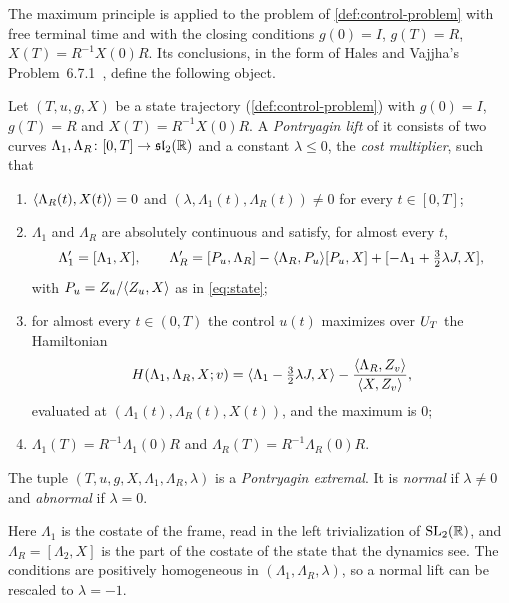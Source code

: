 The maximum principle is applied to the problem of \cref{def:control-problem} with free terminal
time and with the closing conditions $g(0)=I$, $g(T)=R$, $X(T)=R^{-1}X(0)R$. Its conclusions, in
the form of Hales and Vajjha's Problem~6.7.1~\cite{HalesVajjha2024}, define the following object.

\begin{definition}\label{def:pmp-extremal}
Let $(T,u,g,X)$ be a state trajectory (\cref{def:control-problem}) with $g(0)=I$, $g(T)=R$ and
$X(T)=R^{-1}X(0)R$. A \emph{Pontryagin lift} of it consists of two curves
$\Lambda_1,\Lambda_R\colon[0,T]\to\mathfrak{sl}_2(\mathbb{R})$ and a constant $\lambda\le0$, the \emph{cost
multiplier}, such that
\begin{enumerate}
\item $\langle \Lambda_R(t),X(t)\rangle=0$ and $(\lambda,\Lambda_1(t),\Lambda_R(t))\ne0$ for every
  $t\in[0,T]$;
\item $\Lambda_1$ and $\Lambda_R$ are absolutely continuous and satisfy, for almost every $t$,
  \begin{equation}\label{red:costate}
  \Lambda_1'=[\Lambda_1,X],\qquad
  \Lambda_R'=[P_u,\Lambda_R]-\langle \Lambda_R,P_u\rangle[P_u,X]+[-\Lambda_1+\tfrac32\lambda J,X],
  \end{equation}
  with $P_u=Z_u/\langle Z_u,X\rangle$ as in \cref{eq:state};
\item for almost every $t\in(0,T)$ the control $u(t)$ maximizes over $U_{T}$ the Hamiltonian
  \begin{equation}\label{red:hamiltonian}
  H(\Lambda_1,\Lambda_R,X;v)=\langle \Lambda_1-\tfrac32\lambda J,X\rangle
  -\frac{\langle \Lambda_R,Z_v\rangle}{\langle X,Z_v\rangle},
  \end{equation}
  evaluated at $(\Lambda_1(t),\Lambda_R(t),X(t))$, and the maximum is $0$;
\item $\Lambda_1(T)=R^{-1}\Lambda_1(0)R$ and $\Lambda_R(T)=R^{-1}\Lambda_R(0)R$.
\end{enumerate}
The tuple $(T,u,g,X,\Lambda_1,\Lambda_R,\lambda)$ is a \emph{Pontryagin extremal}. It is \emph{normal} if $\lambda\ne0$ and
\emph{abnormal} if $\lambda=0$.
\end{definition}

Here $\Lambda_1$ is the costate of the frame, read in the left trivialization of $\mathrm{SL}_2(\mathbb{R})$, and
$\Lambda_R=[\Lambda_2,X]$ is the part of the costate of the state that the dynamics see. The
conditions are positively homogeneous in $(\Lambda_1,\Lambda_R,\lambda)$, so a normal lift can be
rescaled to $\lambda=-1$.

